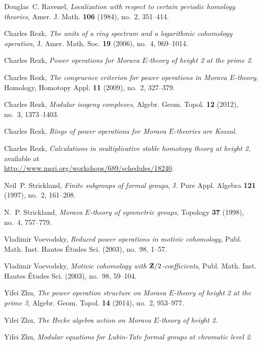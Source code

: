 \documentclass{rs}
\theoremstyle{definition}
\theoremstyle{remark}
\renewcommand{\=}{\approx}
\renewcommand{\-}{\sim}
\numberwithin{equation}{section}
\begin{document}
\begin{thebibliography}
Douglas~C. Ravenel, \emph{Localization with respect to certain periodic
  homology theories}, Amer. J. Math. \textbf{106} (1984), no.~2, 351--414.

Charles Rezk, \emph{The units of a ring spectrum and a logarithmic cohomology
  operation}, J. Amer. Math. Soc. \textbf{19} (2006), no.~4, 969--1014.

Charles Rezk, \emph{Power operations for {M}orava {$E$}-theory of height 2 at 
  the prime 2}. 

Charles Rezk, \emph{The congruence criterion for power operations in {M}orava
  {$E$}-theory}, Homology, Homotopy Appl. \textbf{11} (2009), no.~2, 327--379.

Charles Rezk, \emph{Modular isogeny complexes}, Algebr. Geom. Topol. \textbf{12}
  (2012), no.~3, 1373--1403. 

Charles Rezk, \emph{Rings of power operations for {M}orava {$E$}-theories are
  {K}oszul}. 

Charles Rezk, \emph{Calculations in multiplicative stable homotopy theory at
  height 2}, available at \\
  \href{http://www.msri.org/workshops/689/schedules/18240}
  {http://www.msri.org/workshops/689/schedules/18240}.

Neil~P. Strickland, \emph{Finite subgroups of formal groups}, J. Pure Appl.
  Algebra \textbf{121} (1997), no.~2, 161--208. 

N.~P. Strickland, \emph{Morava {$E$}-theory of symmetric groups}, Topology
  \textbf{37} (1998), no.~4, 757--779. 

Vladimir Voevodsky, \emph{Reduced power operations in motivic cohomology}, Publ.
  Math. Inst. Hautes \'Etudes Sci. (2003), no.~98, 1--57.

Vladimir Voevodsky, \emph{Motivic cohomology with {${\bf Z}/2$}-coefficients},
  Publ. Math. Inst. Hautes \'Etudes Sci. (2003), no.~98, 59--104.

Yifei Zhu, \emph{The power operation structure on {M}orava {$E$}-theory of
  height 2 at the prime 3}, Algebr. Geom. Topol. \textbf{14} (2014), no.~2,
  953--977. 

Yifei Zhu, \emph{The {H}ecke algebra action on {M}orava {$E$}-theory of height
  2}. 

Yifei Zhu, \emph{Modular equations for {L}ubin-{T}ate formal groups at chromatic
  level 2}. 

\end{thebibliography}
\end{document}
